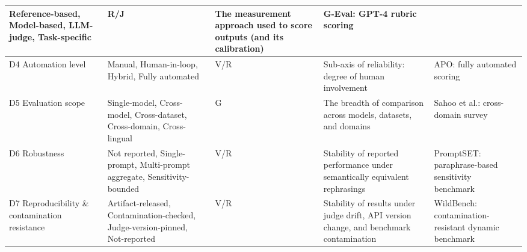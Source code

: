 \documentclass[acmsmall, nonacm, screen]{acmart}
\begin{document}
\begin{table}[!t]
\begin{tabular}{p{1.8cm} p{2.7cm} p{0.6cm} p{3.8cm} p{3.4cm}}
Reference-based, Model-based, LLM-judge, Task-specific &
R/J &
The measurement approach used to score outputs (and its calibration) &
G-Eval: GPT-4 rubric scoring~\cite{liu2023geval} \\
\midrule
D4 Automation level &
Manual, Human-in-loop, Hybrid, Fully automated &
V/R &
Sub-axis of reliability: degree of human involvement &
APO: fully automated scoring~\cite{pryzant2023apo} \\
\midrule
D5 Evaluation scope &
Single-model, Cross-model, Cross-dataset, Cross-domain, Cross-lingual &
G &
The breadth of comparison across models, datasets, and domains &
Sahoo et al.: cross-domain survey~\cite{sahoo2024systematic} \\
\midrule
D6 Robustness &
Not reported, Single-prompt, Multi-prompt aggregate, Sensitivity-bounded &
V/R &
Stability of reported performance under semantically equivalent rephrasings &
PromptSET: paraphrase-based sensitivity benchmark~\cite{promptsensitivity2025} \\
\midrule
D7 Reproducibility \& contamination resistance &
Artifact-released, Contamination-checked, Judge-version-pinned, Not-reported &
V/R &
Stability of results under judge drift, API version change, and benchmark contamination &
WildBench: contamination-resistant dynamic benchmark~\cite{wildbench2024} \\
\bottomrule
\end{tabular}
\end{table}
\end{document}
